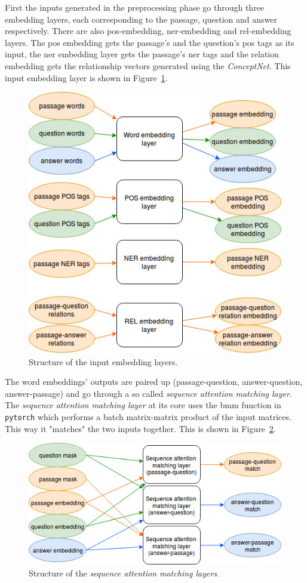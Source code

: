 First the inputs generated in the preprocessing phase go through three embedding layers, each corresponding to the passage, question and answer respectively. There are also pos-embedding, ner-embedding and rel-embedding layers. The pos embedding gets the passage's and the question's pos tags as its input, the ner embedding layer gets the passage's ner tags and the relation embedding gets the relationship vectors generated using the \textit{ConceptNet}. This input embedding layer is shown in Figure~\ref{fig:embedding}.
\begin{figure}[h]
	\centering
	\includegraphics[scale=0.5]{TriAN_embeddings.jpg}
	\caption{Structure of the input embedding layers.}
	\label{fig:embedding}
\end{figure}
The word embeddings' outputs are paired up (passage-question, answer-question, answer-passage) and go through a so called \textit{sequence attention matching layer}.
The \textit{sequence attention matching layer} at its core uses the bmm function in \texttt{pytorch} which performs a batch matrix-matrix product of the input matrices.
This way it "matches" the two inputs together. This is shown in Figure~\ref{fig:attention_match}.
\begin{figure}[h]
	\centering
	\includegraphics[scale=0.5]{TriAN_attention_match.jpg}
	\caption{Structure of the \textit{sequence attention matching layers}.}
	\label{fig:attention_match}
\end{figure}
